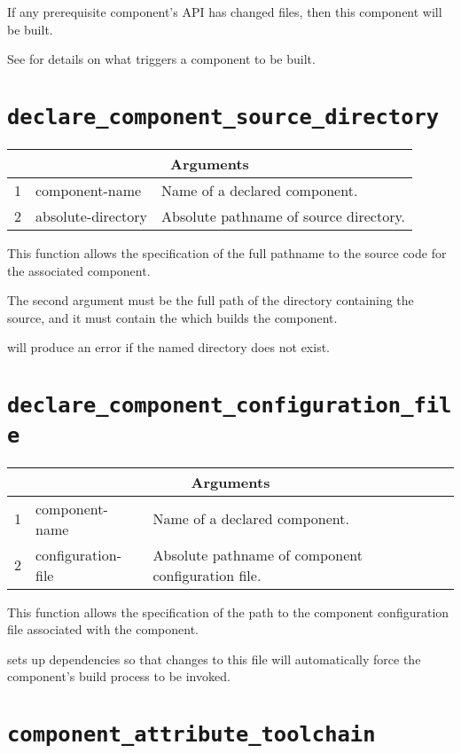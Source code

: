 If any prerequisite component's API has changed files, then this
component will be built.

See  for details on what triggers
a component to be built.

\section{\texttt{declare\_component\_source\_directory}}\label{api:source-directory}

\begin{tabularx}{\linewidth}{ll|X}
  \multicolumn{3}{c}{\textbf{Arguments}} \\ \hline

  1 & component-name & Name of a declared component. \\
  2 & absolute-directory & Absolute pathname of source directory.
\end{tabularx}

This function allows the specification of the full pathname to the
source code for the associated component.

The second argument must be the full path of the directory containing
the source, and it must contain the \makefile which builds the
component.

\lmsbw will produce an error if the named directory does not exist.

\section{\texttt{declare\_component\_configuration\_file}}\label{api:configuration-file}

\begin{tabularx}{\linewidth}{ll|X}
  \multicolumn{3}{c}{\textbf{Arguments}} \\ \hline

  1 & component-name & Name of a declared component. \\
  2 & configuration-file & Absolute pathname of component configuration
  file.
\end{tabularx}

This function allows the specification of the path to the component
configuration file associated with the component.

\lmsbw sets up dependencies so that changes to this file will
automatically force the component's build process to be invoked.


\section{\texttt{component\_attribute\_toolchain}}\label{api:toolchain}

